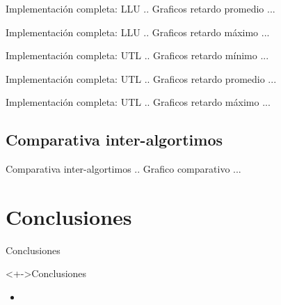 \documentclass[xcolor=dvipsnames]{beamer}
\begin{document}
\begin{frame}{Implementación completa: LLU} 
 .. Graficos retardo promedio ...
\end{frame}


\begin{frame}{Implementación completa: LLU} 
 .. Graficos retardo máximo ...
\end{frame}


\begin{frame}{Implementación completa: UTL} 
 .. Graficos retardo mínimo ...
\end{frame}


\begin{frame}{Implementación completa: UTL} 
 .. Graficos retardo promedio ...
\end{frame}


\begin{frame}{Implementación completa: UTL} 
 .. Graficos retardo máximo ...
\end{frame}

\subsection{Comparativa inter-algortimos}
\begin{frame}{Comparativa inter-algortimos} 
 .. Grafico comparativo ...
\end{frame}

\section{Conclusiones}
\begin{frame}{Conclusiones} 
\begin{block}<+->{Conclusiones}   
    \begin{itemize}
      \scriptsize
     	\item     	
    \end{itemize}
  \end{block}
\end{frame}
\end{document}
